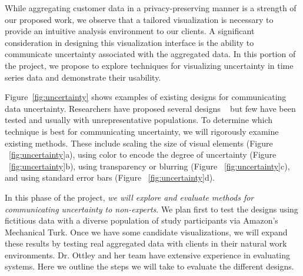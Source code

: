 While aggregating customer data in a privacy-preserving manner is a strength of our proposed work, we observe that a tailored visualization is necessary to provide an intuitive analysis environment to our clients. 
A significant consideration in designing this visualization interface is the ability to communicate uncertainty associated with the aggregated data. 
In this portion of the project, we propose to explore techniques for visualizing uncertainty in time series data and demonstrate their usability.

Figure~\ref{fig:uncertainty} shows examples of existing designs for communicating data uncertainty.
Researchers have proposed several designs ~\cite{brodlie2012review,sanyal2009user,sanyal2010noodles,spiegelhalter2011visualizing} but few have been tested and usually with unrepresentative populations.  
To determine which technique is best for communicating uncertainty, we will rigorously examine existing methods. 
These include scaling the size of visual elements (Figure ~\ref{fig:uncertainty}a), using color to encode the degree of uncertainty (Figure ~\ref{fig:uncertainty}b), using transparency or blurring (Figure ~\ref{fig:uncertainty}c), and using standard error bars (Figure ~\ref{fig:uncertainty}d). 

In this phase of the project, \emph{we will explore and evaluate methods for communicating uncertainty to non-experts}.
We plan first to test the designs using fictitious data with a diverse population of study participants via Amazon's Mechanical Turk. 
Once we have some candidate visualizations, we will expand these results by testing real aggregated data with clients in their natural work environments.
Dr. Ottley and her team have extensive experience in evaluating systems.
Here we outline the steps we will take to evaluate the different designs.   

